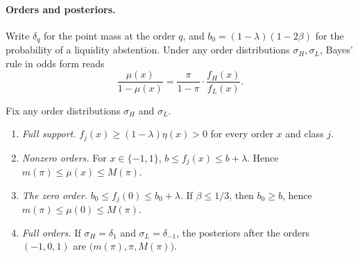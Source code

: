\paragraph{Orders and posteriors.}
Write \(\delta_q\) for the point mass at the order \(q\), and \(b_0=(1-\lambda)(1-2\beta)\) for the probability
of a liquidity abstention. Under any order distributions \(\sigma_H,\sigma_L\), Bayes' rule in odds form reads
\begin{equation}\label{eq:odds}
\frac{\mu(x)}{1-\mu(x)}=\frac{\pi}{1-\pi}\cdot\frac{f_H(x)}{f_L(x)}.
\end{equation}

\begin{lemma}\label{lem:beliefs}
Fix any order distributions \(\sigma_H\) and \(\sigma_L\).
\begin{enumerate}[label=(\alph*),leftmargin=2em]
\item \emph{Full support.} \(f_j(x)\ge(1-\lambda)\eta(x)>0\) for every order \(x\) and class \(j\).
\item \emph{Nonzero orders.} For \(x\in\{-1,1\}\), \(b\le f_j(x)\le b+\lambda\). Hence
\(m(\pi)\le\mu(x)\le M(\pi)\).
\item \emph{The zero order.} \(b_0\le f_j(0)\le b_0+\lambda\). If \(\beta\le1/3\), then \(b_0\ge b\), hence
\(m(\pi)\le\mu(0)\le M(\pi)\).
\item \emph{Full orders.} If \(\sigma_H=\delta_1\) and \(\sigma_L=\delta_{-1}\), the posteriors after the orders
\((-1,0,1)\) are \(\bigl(m(\pi),\pi,M(\pi)\bigr)\).
\end{enumerate}
\end{lemma}


